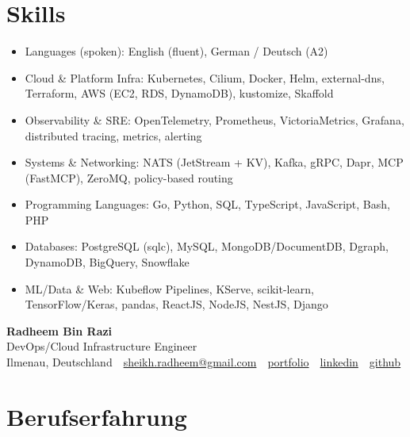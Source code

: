 \documentclass[10pt,a4paper]{resume}
\makeatletter
\newcommand{\Portfolio}{https://radheem.github.io/my-cv}
\newcommand{\PortfolioText}{portfolio}
\newcommand{\GitHub}{https://github.com/radheem}
\newcommand{\LinkedIn}{https://www.linkedin.com/in/radheem-razi}
\newcommand{\Email}{sheikh.radheem@gmail.com}
\makeatother
\begin{document}
\section{Skills}

\begin{itemize}[leftmargin=1.4em,nosep,topsep=2pt]
  \item Languages (spoken): English (fluent), German / Deutsch (A2)
  \item Cloud \& Platform Infra: Kubernetes, Cilium, Docker, Helm, external-dns, Terraform, AWS (EC2, RDS, DynamoDB), kustomize, Skaffold
  \item Observability \& SRE: OpenTelemetry, Prometheus, VictoriaMetrics, Grafana, distributed tracing, metrics, alerting
  \item Systems \& Networking: NATS (JetStream + KV), Kafka, gRPC, Dapr, MCP (FastMCP), ZeroMQ, policy-based routing
  \item Programming Languages: Go, Python, SQL, TypeScript, JavaScript, Bash, PHP
  \item Databases: PostgreSQL (sqlc), MySQL, MongoDB/DocumentDB, Dgraph, DynamoDB, BigQuery, Snowflake
  \item ML/Data \& Web: Kubeflow Pipelines, KServe, scikit-learn, TensorFlow/Keras, pandas, ReactJS, NodeJS, NestJS, Django
\end{itemize}

\clearpage
{}

\begin{center}
  {\huge\bfseries Radheem Bin Razi}\\[3pt]
  {\large DevOps/Cloud Infrastructure Engineer}\\[6pt]
  \small
  Ilmenau, Deutschland \,\textbar\,
  \href{mailto:\Email}{\Email} \,\textbar\,
  \href{\Portfolio}{\PortfolioText} \,\textbar\,
  \href{\LinkedIn}{linkedin} \,\textbar\,
  \href{\GitHub}{github}
\end{center}
\vspace{2pt}

\section{Berufserfahrung}
\end{document}
